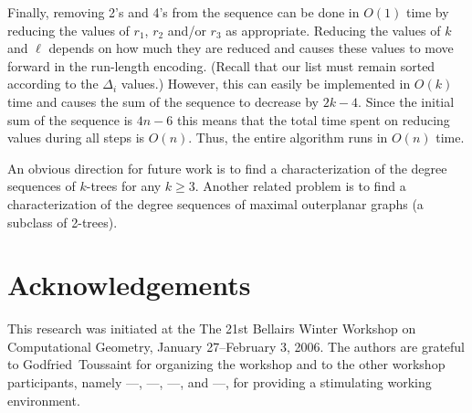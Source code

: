 \documentclass[lotsofwhite,charterfonts]{patmorin}
\begin{document}
Finally, removing 2's and 4's from the sequence can be done in $O(1)$
time by reducing the values of $r_1$, $r_2$ and/or $r_3$ as
appropriate.  Reducing the values of $k$ and $\ell$ depends on how
much they are reduced and causes these values to move forward in the
run-length encoding. (Recall that our list must remain sorted
according to the $\Delta_i$ values.) However, this can easily be
implemented in $O(k)$ time and causes the sum of the sequence to
decrease by $2k-4$.  Since the initial sum of the sequence is $4n-6$
this means that the total time spent on reducing values during all
steps is $O(n)$.  Thus, the entire algorithm runs in $O(n)$ time.

An obvious direction for future work is to find a characterization of
the degree sequences of $k$-trees for any $k\ge 3$.  Another related
problem is to find a characterization of the degree sequences of
maximal outerplanar graphs (a subclass of 2-trees).

\section{Acknowledgements}

This research was initiated at the The 21st Bellairs Winter Workshop
on Computational Geometry, January 27--February 3, 2006.  The authors
are grateful to Godfried~Toussaint for organizing the workshop and to
the other workshop participants, namely
---,
---,
---, and
---,
for providing a stimulating working environment.




\end{document}
